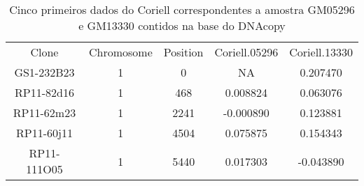 \begin{table}[h]
 \centering
 {\renewcommand\arraystretch{1.25}
 \caption{Cinco primeiros dados do Coriell correspondentes a amostra GM05296 e GM13330 contidos na base do DNAcopy}
 \label{tab:tabela-2-dados}
 \begin{tabular}{ l l l l l }
  \cline{1-1}\cline{2-2}\cline{3-3}\cline{4-4}\cline{5-5}  
    \multicolumn{1}{c}{Clone \centering } &
    \multicolumn{1}{c}{Chromosome \centering } &
    \multicolumn{1}{c}{Position \centering } &
    \multicolumn{1}{c}{Coriell.05296 \centering } &
    \multicolumn{1}{c}{Coriell.13330 \centering }
  \\  
  \cline{1-1}\cline{2-2}\cline{3-3}\cline{4-4}\cline{5-5}  
    \multicolumn{1}{c}{GS1-232B23 \centering } &
    \multicolumn{1}{c}{1 \centering } &
    \multicolumn{1}{c}{0 \centering } &
    \multicolumn{1}{c}{NA \centering } &
    \multicolumn{1}{c}{0.207470 \centering }
  \\  
  \cline{1-1}\cline{2-2}\cline{3-3}\cline{4-4}\cline{5-5}  
    \multicolumn{1}{c}{RP11-82d16 \centering } &
    \multicolumn{1}{c}{1 \centering } &
    \multicolumn{1}{c}{468 \centering } &
    \multicolumn{1}{c}{0.008824 \centering } &
    \multicolumn{1}{c}{0.063076 \centering }
  \\  
  \cline{1-1}\cline{2-2}\cline{3-3}\cline{4-4}\cline{5-5}  
    \multicolumn{1}{c}{RP11-62m23 \centering } &
    \multicolumn{1}{c}{1 \centering } &
    \multicolumn{1}{c}{2241 \centering } &
    \multicolumn{1}{c}{-0.000890 \centering } &
    \multicolumn{1}{c}{0.123881 \centering }
  \\  
  \cline{1-1}\cline{2-2}\cline{3-3}\cline{4-4}\cline{5-5}  
    \multicolumn{1}{c}{RP11-60j11 \centering } &
    \multicolumn{1}{c}{1 \centering } &
    \multicolumn{1}{c}{4504 \centering } &
    \multicolumn{1}{c}{0.075875 \centering } &
    \multicolumn{1}{c}{0.154343 \centering }
  \\  
  \cline{1-1}\cline{2-2}\cline{3-3}\cline{4-4}\cline{5-5}  
    \multicolumn{1}{c}{RP11-111O05 \centering } &
    \multicolumn{1}{c}{1 \centering } &
    \multicolumn{1}{c}{5440 \centering } &
    \multicolumn{1}{c}{0.017303 \centering } &
    \multicolumn{1}{c}{-0.043890 \centering }
  \\  
  \hline

 \end{tabular} }
\end{table}